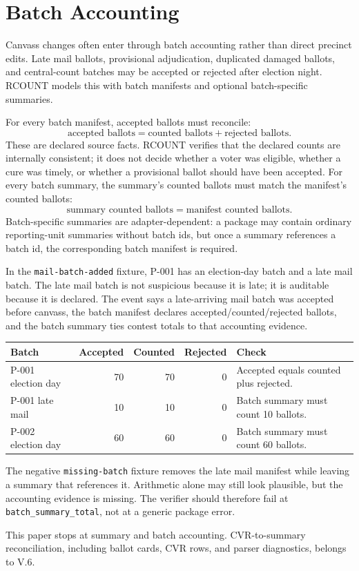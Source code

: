 \section{Batch Accounting}

Canvass changes often enter through batch accounting rather than direct precinct
edits. Late mail ballots, provisional adjudication, duplicated damaged ballots,
and central-count batches may be accepted or rejected after election night.
RCOUNT models this with batch manifests and optional batch-specific summaries.

For every batch manifest, accepted ballots must reconcile:
\[
  \text{accepted ballots} =
  \text{counted ballots} + \text{rejected ballots}.
\]
These are declared source facts. RCOUNT verifies that the declared counts are
internally consistent; it does not decide whether a voter was eligible, whether
a cure was timely, or whether a provisional ballot should have been accepted.
For every batch summary, the summary's counted ballots must match the manifest's
counted ballots:
\[
  \text{summary counted ballots} =
  \text{manifest counted ballots}.
\]
Batch-specific summaries are adapter-dependent: a package may contain ordinary
reporting-unit summaries without batch ids, but once a summary references a
batch id, the corresponding batch manifest is required.

In the \texttt{mail-batch-added} fixture, P-001 has an election-day batch and a
late mail batch. The late mail batch is not suspicious because it is late; it is
auditable because it is declared. The event says a late-arriving mail batch was
accepted before canvass, the batch manifest declares accepted/counted/rejected
ballots, and the batch summary ties contest totals to that accounting evidence.

\begin{center}
\small
\begin{tabularx}{\textwidth}{lrrrX}
\toprule
Batch & Accepted & Counted & Rejected & Check \\
\midrule
P-001 election day & 70 & 70 & 0 & Accepted equals counted plus rejected. \\
P-001 late mail & 10 & 10 & 0 & Batch summary must count 10 ballots. \\
P-002 election day & 60 & 60 & 0 & Batch summary must count 60 ballots. \\
\bottomrule
\end{tabularx}
\end{center}

The negative \texttt{missing-batch} fixture removes the late mail manifest while
leaving a summary that references it. Arithmetic alone may still look plausible,
but the accounting evidence is missing. The verifier should therefore fail at
\texttt{batch\_summary\_total}, not at a generic package error.

This paper stops at summary and batch accounting. CVR-to-summary reconciliation,
including ballot cards, CVR rows, and parser diagnostics, belongs to V.6.
